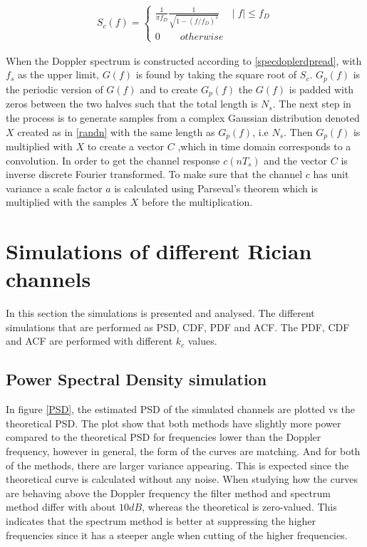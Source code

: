 \documentclass[conference]{IEEEtran}
\begin{document}
\begin{equation}
\begin{split}
S_c(f) =  \begin{cases} \frac{1}{\pi f_D}\frac{1}{\sqrt{1-(f/f_D)^2}} \quad \mid f\mid \leq f_D \\
0 \quad\quad{otherwise}
\end{cases}
\end{split}
\label{specdoplerdpread}
\end{equation}

When the Doppler spectrum is constructed according to \ref{specdoplerdpread}, with $f_{s}$ as the upper limit, $G(f)$ is found by taking the square root of $S_c$. $G_{p}(f) $ is the periodic version of $G(f)$ and to create $G_{p}(f) $ the $G(f)$ is padded with zeros between the two halves such that the total length is $N_s$. The next step in the process is to generate samples from a complex Gaussian distribution denoted $X$ created as in \eqref{randn} with the same length as $G_p(f)$, i.e $N_s$. Then $G_p(f)$ is multiplied with $X$ to create a vector $C$ ,which in time domain corresponds to a convolution. In order to get the channel response $c(nT_s)$ and the vector $C$ is inverse discrete Fourier transformed. To make sure that the channel $c$ has unit variance a scale factor $a$ is calculated using Parseval's theorem which is multiplied with the samples $X$ before the multiplication. 
     
\section{Simulations of different Rician channels}
In this section the simulations is presented and analysed. The different simulations that are performed as PSD, CDF, PDF and ACF. The PDF, CDF and ACF are performed with different $k_{c}$ values.     

\subsection{Power Spectral Density simulation}
    In figure \ref{PSD}, the estimated PSD of the simulated channels are plotted vs the theoretical PSD. The plot show that both methods have slightly more power compared to the theoretical PSD for frequencies lower than the Doppler frequency, however in general, the form of the curves are matching. And for both of the methods, there are larger variance appearing. This is expected since the theoretical curve is calculated without any noise. When studying how the curves are behaving above the Doppler frequency the filter method and spectrum method differ with about $10 dB$, whereas the theoretical is zero-valued. This indicates that the spectrum method is better at suppressing the higher frequencies since it has a steeper angle when cutting of the higher frequencies.
    
\end{document}
